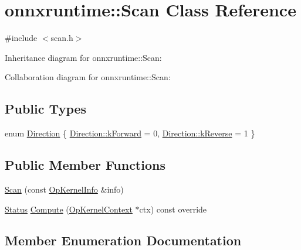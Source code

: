\hypertarget{classonnxruntime_1_1Scan}{}\section{onnxruntime\+:\+:Scan Class Reference}
\label{classonnxruntime_1_1Scan}


{\ttfamily \#include $<$scan.\+h$>$}



Inheritance diagram for onnxruntime\+:\+:Scan\+:


Collaboration diagram for onnxruntime\+:\+:Scan\+:
\subsection*{Public Types}
\begin{DoxyCompactItemize}
\item 
enum \mbox{\hyperlink{classonnxruntime_1_1Scan_abd9c1538172fe44f60cbf8e273fb2dcc}{Direction}} \{ \mbox{\hyperlink{classonnxruntime_1_1Scan_abd9c1538172fe44f60cbf8e273fb2dccae7c3602dce09c755e09250077a601a51}{Direction\+::k\+Forward}} = 0, 
\mbox{\hyperlink{classonnxruntime_1_1Scan_abd9c1538172fe44f60cbf8e273fb2dccabec8e974f160af3e10611c35be7972be}{Direction\+::k\+Reverse}} = 1
 \}
\end{DoxyCompactItemize}
\subsection*{Public Member Functions}
\begin{DoxyCompactItemize}
\item 
\mbox{\hyperlink{classonnxruntime_1_1Scan_a3448b5b4cfae6fcd6deb4bf98f585299}{Scan}} (const \mbox{\hyperlink{classonnxruntime_1_1OpKernelInfo}{Op\+Kernel\+Info}} \&info)
\item 
\mbox{\hyperlink{classonnxruntime_1_1common_1_1Status}{Status}} \mbox{\hyperlink{classonnxruntime_1_1Scan_a8b765a2fd147e1ca9d5d2d3d15487953}{Compute}} (\mbox{\hyperlink{classonnxruntime_1_1OpKernelContext}{Op\+Kernel\+Context}} $\ast$ctx) const override
\end{DoxyCompactItemize}


\subsection{Member Enumeration Documentation}
\mbox{\label{classonnxruntime_1_1Scan_abd9c1538172fe44f60cbf8e273fb2dcc}} 
